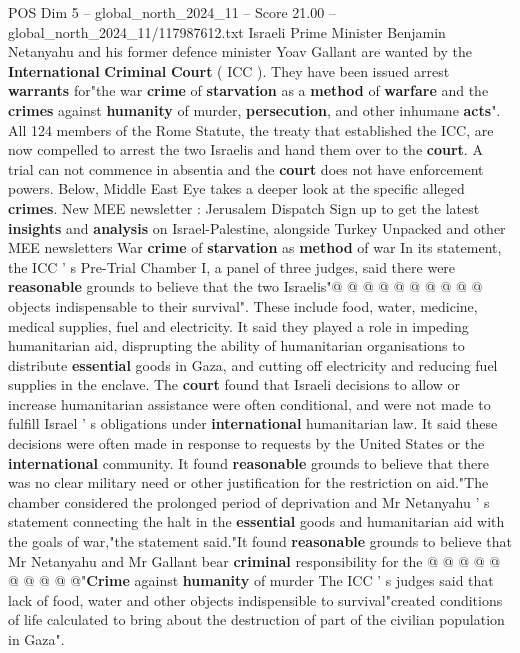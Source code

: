 \begin{textsample}{POS Dim 5 – global\_north\_2024\_11 – Score 21.00 – global\_north\_2024\_11/117987612.txt}  \label{ex:f5_pos_039}
Israeli Prime Minister Benjamin Netanyahu and his former defence minister Yoav Gallant are wanted by the \textbf{International} \textbf{Criminal} \textbf{Court} ( ICC ).
They have been issued arrest \textbf{warrants} for"the war \textbf{crime} of \textbf{starvation} as a \textbf{method} of \textbf{warfare} and the \textbf{crimes} against \textbf{humanity} of murder, \textbf{persecution}, and other inhumane \textbf{acts}".
All 124 members of the Rome Statute, the treaty that established the ICC, are now compelled to arrest the two Israelis and hand them over to the \textbf{court}.
A trial can not commence in absentia and the \textbf{court} does not have enforcement powers.
Below, Middle East Eye takes a deeper look at the specific alleged \textbf{crimes}.
New MEE newsletter : Jerusalem Dispatch Sign up to get the latest \textbf{insights} and \textbf{analysis} on Israel-Palestine, alongside Turkey Unpacked and other MEE newsletters War \textbf{crime} of \textbf{starvation} as \textbf{method} of war In its statement, the ICC ' s Pre-Trial Chamber I, a panel of three judges, said there were \textbf{reasonable} grounds to believe that the two Israelis"@ @ @ @ @ @ @ @ @ @ objects indispensable to their survival".
These include food, water, medicine, medical supplies, fuel and electricity.
It said they played a role in impeding humanitarian aid, disprupting the ability of humanitarian organisations to distribute \textbf{essential} goods in Gaza, and cutting off electricity and reducing fuel supplies in the enclave.
The \textbf{court} found that Israeli decisions to allow or increase humanitarian assistance were often conditional, and were not made to fulfill Israel ' s obligations under \textbf{international} humanitarian law.
It said these decisions were often made in response to requests by the United States or the \textbf{international} community.
It found \textbf{reasonable} grounds to believe that there was no clear military need or other justification for the restriction on aid."The chamber considered the prolonged period of deprivation and Mr Netanyahu ' s statement connecting the halt in the \textbf{essential} goods and humanitarian aid with the goals of war,"the statement said."It found \textbf{reasonable} grounds to believe that Mr Netanyahu and Mr Gallant bear \textbf{criminal} responsibility for the @ @ @ @ @ @ @ @ @ @"\textbf{Crime} against \textbf{humanity} of murder The ICC ' s judges said that lack of food, water and other objects indispensible to survival"created conditions of life calculated to bring about the destruction of part of the civilian population in Gaza".

\end{textsample}
